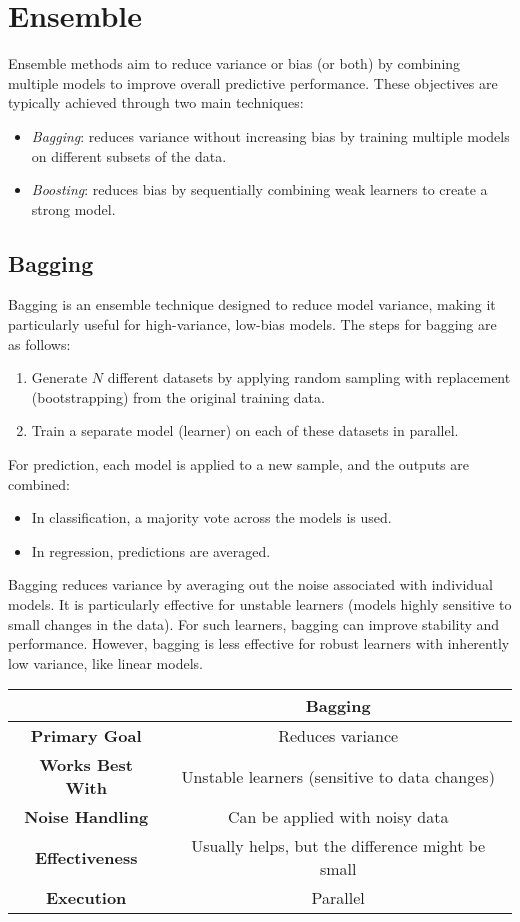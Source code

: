 \section{Ensemble}

Ensemble methods aim to reduce variance or bias (or both) by combining multiple models to improve overall predictive performance. 
These objectives are typically achieved through two main techniques:
\begin{itemize}
    \item \textit{Bagging}: reduces variance without increasing bias by training multiple models on different subsets of the data.
    \item \textit{Boosting}: reduces bias by sequentially combining weak learners to create a strong model.
\end{itemize}

\subsection{Bagging}
Bagging is an ensemble technique designed to reduce model variance, making it particularly useful for high-variance, low-bias models. 
The steps for bagging are as follows:
\begin{enumerate}
    \item Generate $N$ different datasets by applying random sampling with replacement (bootstrapping) from the original training data.
    \item Train a separate model (learner) on each of these datasets in parallel.
\end{enumerate}
For prediction, each model is applied to a new sample, and the outputs are combined: 
\begin{itemize} 
    \item In classification, a majority vote across the models is used. 
    \item In regression, predictions are averaged. 
\end{itemize}
Bagging reduces variance by averaging out the noise associated with individual models. 
It is particularly effective for unstable learners (models highly sensitive to small changes in the data).
For such learners, bagging can improve stability and performance.
However, bagging is less effective for robust learners with inherently low variance, like linear models.
\begin{table}[H]
    \centering
    \begin{tabular}{|c|c|}
    \hline
    & \textbf{Bagging} \\ \hline
    \textbf{Primary Goal} & Reduces variance \\ \hline
    \textbf{Works Best With} & Unstable learners (sensitive to data changes) \\ \hline
    \textbf{Noise Handling} & Can be applied with noisy data \\ \hline
    \textbf{Effectiveness} & Usually helps, but the difference might be small \\ \hline
    \textbf{Execution} & Parallel \\ \hline
    \end{tabular}
\end{table}


